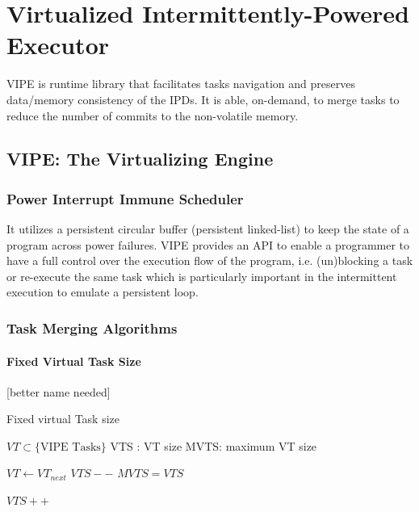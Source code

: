 \documentclass[pageno]{jpaper}
\newcommand{\sys}{VIPE\xspace}
\newcommand{\sysfull}{Virtualized Intermittently-Powered Executor\xspace}
\begin{document}
\section{\sysfull}
\sys is runtime library that facilitates tasks navigation and preserves data/memory consistency of the IPDs. It is able, on-demand, to merge tasks to reduce the number of commits to the non-volatile memory.



\subsection{\sys: The Virtualizing Engine}
\subsubsection{Power Interrupt Immune Scheduler}
It utilizes a persistent circular buffer (persistent linked-list) to keep the state of a program across power failures. \sys provides an API to enable a programmer to have a full control over the execution flow of the program, i.e. (un)blocking a task or re-execute the same task which is particularly important in the intermittent execution to emulate a persistent loop. 

\subsubsection{Task Merging Algorithms}

\paragraph{Fixed Virtual Task Size} [better name needed]

	\begin{algorithm}[t]
		\caption{Fixed virtual Task size}
		\label{algo:fixVirtTask}
		\scriptsize
		\begin{algorithmic}[1]
			\State $VT \subset \text{\{\sys Tasks\}} $  
			\State VTS : VT size
			\State MVTS: maximum VT size
			\vspace{0.1cm}

				\State $VT \leftarrow VT_{next}$
				\vspace{0.1cm}
							\State $VTS--$  
							\State $ MVTS = VTS $
						\EndIf
				\EndWhile

				\vspace{0.1cm}
					\State $VTS++$
					\EndIf
				\EndIf
			\EndWhile
		\end{algorithmic}
	\end{algorithm}
\end{document}
